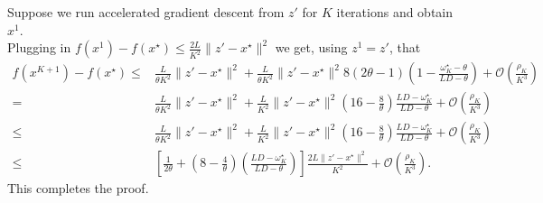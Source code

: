 Suppose we run accelerated gradient descent from $z'$ for $K$ iterations and
obtain $x^1$. \\

Plugging in $f (x^1) - f (x^{\star}) \leq \tfrac{2 L}{K^2} \| z' - x^{\star}
\|^2$ we get, using $z^1 = z'$, that
\begin{align}
  f (x^{K + 1}) - f (x^{\star}) \leq{} & \tfrac{L}{\theta K^2} \| z' - x^{\star}
  \|^2 + \tfrac{L}{\theta K^2} \| z' - x^{\star} \|^2 8 (2 \theta - 1)
  ( 1 - \tfrac{\omega^\star_K - \theta}{L D - \theta} ) +\mathcal{O} (
  \tfrac{\rho_K}{K^3} ) \nonumber\\
  ={} & \tfrac{L}{\theta K^2} \| z' - x^{\star} \|^2 + \tfrac{L}{K^2} \| z' -
  x^{\star} \|^2  ( 16 - \tfrac{8}{\theta} ) \tfrac{L D -
  \omega^\star_K}{L D - \theta} +\mathcal{O} ( \tfrac{\rho_K}{K^3} )
  \nonumber\\
  \leq{} & \tfrac{L}{\theta K^2} \| z' - x^{\star} \|^2 + \tfrac{L}{K^2} \| z' -
  x^{\star} \|^2 (16 - \tfrac{8}{\theta} ) \tfrac{L D -
  \omega^\star_K}{L D - \theta} +\mathcal{O} ( \tfrac{\rho_K}{K^3} )
  \nonumber\\
  \leq{} & [ \tfrac{1}{2 \theta} +  ( 8 - \tfrac{4}{\theta} )
  ( \tfrac{L D - \omega^\star_K}{L D - \theta} ) ] \tfrac{2 L \| z' -
  x^{\star} \|^2}{K^2} +\mathcal{O} ( \tfrac{\rho_K}{K^3} ) .
  \nonumber
\end{align}
This completes the proof.
